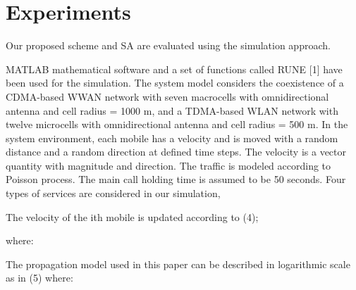 \section{Experiments} \label{sec:Experimentation}

Our proposed scheme and SA are evaluated using the simulation approach.

MATLAB mathematical software and a set of functions called RUNE [1] have been used for the simulation.
The system model considers the coexistence of a CDMA-based WWAN network with seven macrocells with omnidirectional antenna and cell radius = 1000 m,
	and a TDMA-based WLAN network with twelve microcells with omnidirectional antenna and cell radius = 500 m.
In the system environment,
	each mobile has a velocity and is moved with a random distance and a random direction at defined time steps.
The velocity is a vector quantity with magnitude and direction.
The traffic is modeled according to Poisson process.
The main call holding time is assumed to be 50 seconds.
Four types of services are considered in our simulation,


The velocity of the ith mobile is updated according to (4);

where:

The propagation model used in this paper can be described in logarithmic scale as in (5)
where:


